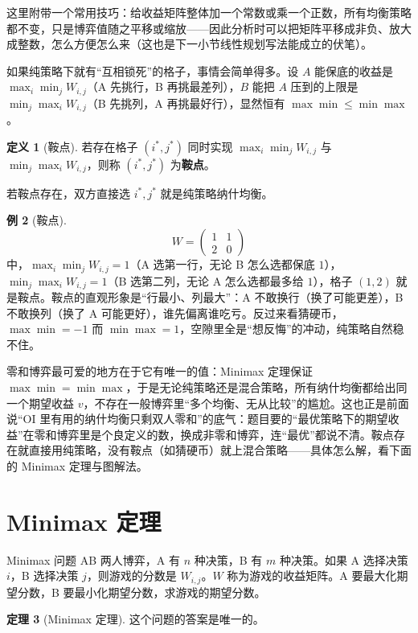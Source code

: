 \documentclass[UTF8,a4paper,11pt,oneside,openany,fontset=fandol]{ctexbook}
\theoremstyle{definition}
\newtheorem{definition}{定义}[chapter]
\newtheorem{theorem}[definition]{定理}
\newtheorem{example}[definition]{例}
\begin{document}
这里附带一个常用技巧：给收益矩阵整体加一个常数或乘一个正数，所有均衡策略都不变，只是博弈值随之平移或缩放——因此分析时可以把矩阵平移成非负、放大成整数，怎么方便怎么来（这也是下一小节线性规划写法能成立的伏笔）。

如果纯策略下就有“互相锁死”的格子，事情会简单得多。设 $A$ 能保底的收益是 $\max_i\min_j W_{i,j}$（A 先挑行，B 再挑最差列），$B$ 能把 $A$ 压到的上限是 $\min_j\max_i W_{i,j}$（B 先挑列，A 再挑最好行），显然恒有 $\max\min\le\min\max$。

\begin{definition}[鞍点]
若存在格子 $(i^*,j^*)$ 同时实现 $\max_i\min_j W_{i,j}$ 与 $\min_j\max_i W_{i,j}$，则称 $(i^*,j^*)$ 为\textbf{鞍点}。
\end{definition}

若鞍点存在，双方直接选 $i^*,j^*$ 就是纯策略纳什均衡。

\begin{example}[鞍点]
\[
 W=\begin{pmatrix}1&1\\2&0\end{pmatrix}
\]
中，$\max_i\min_j W_{i,j}=1$（A 选第一行，无论 B 怎么选都保底 $1$），$\min_j\max_i W_{i,j}=1$（B 选第二列，无论 A 怎么选都最多给 $1$），格子 $(1,2)$ 就是鞍点。鞍点的直观形象是“行最小、列最大”：A 不敢换行（换了可能更差），B 不敢换列（换了 A 可能更好），谁先偏离谁吃亏。反过来看猜硬币，$\max\min=-1$ 而 $\min\max=1$，空隙里全是“想反悔”的冲动，纯策略自然稳不住。
\end{example}

零和博弈最可爱的地方在于它有唯一的值：Minimax 定理保证 $\max\min=\min\max$，于是无论纯策略还是混合策略，所有纳什均衡都给出同一个期望收益 $v$，不存在一般博弈里“多个均衡、无从比较”的尴尬。这也正是前面说“OI 里有用的纳什均衡只剩双人零和”的底气：题目要的“最优策略下的期望收益”在零和博弈里是个良定义的数，换成非零和博弈，连“最优”都说不清。鞍点存在就直接用纯策略，没有鞍点（如猜硬币）就上混合策略——具体怎么解，看下面的 Minimax 定理与图解法。

\section{Minimax 定理}
\begin{problem}{Minimax 问题}
AB 两人博弈，A 有 $n$ 种决策，B 有 $m$ 种决策。如果 A 选择决策 $i$，B 选择决策 $j$，则游戏的分数是 $W_{i,j}$。$W$ 称为游戏的收益矩阵。A 要最大化期望分数，B 要最小化期望分数，求游戏的期望分数。
\end{problem}

\begin{theorem}[Minimax 定理]\label{thm:minimax}
这个问题的答案是唯一的。
\end{theorem}
\end{document}
